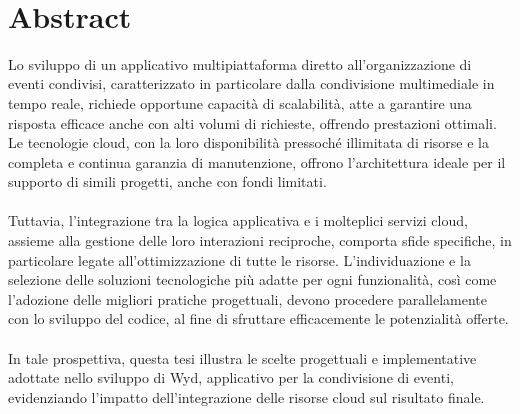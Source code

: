 \newpage
\
\newpage

\chapter*{Abstract}


Lo sviluppo di un applicativo multipiattaforma diretto all'organizzazione di eventi condivisi,
caratterizzato in particolare dalla condivisione multimediale in tempo reale,
richiede opportune capacità di scalabilità, 
atte a garantire una risposta efficace anche con alti volumi di richieste, offrendo prestazioni ottimali. 
Le tecnologie cloud, con la loro disponibilità pressoché illimitata di risorse e la completa e continua garanzia  di manutenzione, 
offrono l'architettura ideale per il supporto di simili progetti, anche con fondi limitati.\\
\\
Tuttavia, l'integrazione tra la logica applicativa e i molteplici servizi cloud, 
assieme alla gestione delle loro interazioni reciproche, comporta sfide specifiche, 
in particolare legate all'ottimizzazione di tutte le risorse.
L'individuazione e la selezione delle soluzioni tecnologiche più adatte per ogni funzionalità, 
così come l'adozione delle migliori pratiche progettuali,
devono procedere parallelamente con lo sviluppo del codice, 
al fine di sfruttare efficacemente le potenzialità offerte.\\
\\
In tale prospettiva, 
questa tesi illustra le scelte progettuali e implementative adottate nello sviluppo di Wyd,
applicativo per la condivisione di eventi,
evidenziando l'impatto dell'integrazione delle risorse cloud sul risultato finale.\\
\clearpage